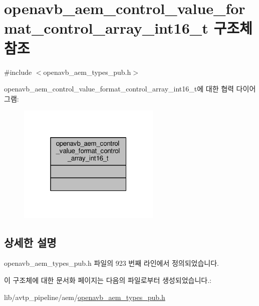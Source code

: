 \hypertarget{structopenavb__aem__control__value__format__control__array__int16__t}{}\section{openavb\+\_\+aem\+\_\+control\+\_\+value\+\_\+format\+\_\+control\+\_\+array\+\_\+int16\+\_\+t 구조체 참조}
\label{structopenavb__aem__control__value__format__control__array__int16__t}


{\ttfamily \#include $<$openavb\+\_\+aem\+\_\+types\+\_\+pub.\+h$>$}



openavb\+\_\+aem\+\_\+control\+\_\+value\+\_\+format\+\_\+control\+\_\+array\+\_\+int16\+\_\+t에 대한 협력 다이어그램\+:
\nopagebreak
\begin{figure}[H]
\begin{center}
\leavevmode
\includegraphics[width=193pt]{structopenavb__aem__control__value__format__control__array__int16__t__coll__graph}
\end{center}
\end{figure}


\subsection{상세한 설명}


openavb\+\_\+aem\+\_\+types\+\_\+pub.\+h 파일의 923 번째 라인에서 정의되었습니다.



이 구조체에 대한 문서화 페이지는 다음의 파일로부터 생성되었습니다.\+:\begin{DoxyCompactItemize}
\item 
lib/avtp\+\_\+pipeline/aem/\hyperlink{openavb__aem__types__pub_8h}{openavb\+\_\+aem\+\_\+types\+\_\+pub.\+h}\end{DoxyCompactItemize}
